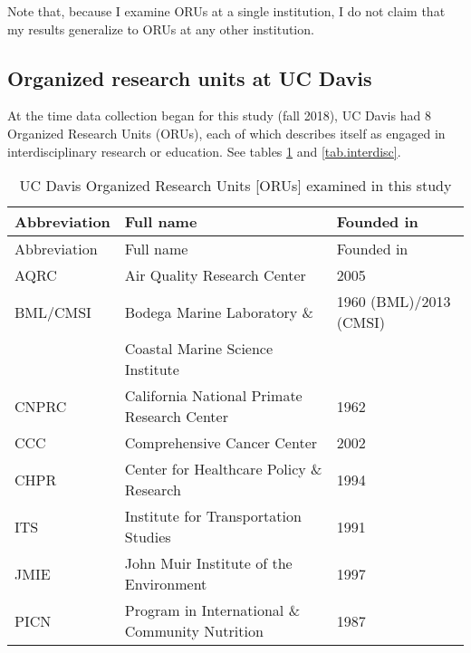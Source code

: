 \documentclass[
  11pt,
]{article}
\begin{document}
Note that, because I examine ORUs at a single institution, I do not claim that my results generalize to ORUs at any other institution.

\hypertarget{organized-research-units-at-uc-davis}{%
\subsection{Organized research units at UC Davis}\label{organized-research-units-at-uc-davis}}

At the time data collection began for this study (fall 2018), UC Davis had 8 Organized Research Units (ORUs), each of which describes itself as engaged in interdisciplinary research or education. See tables \ref{tab.orus} and \ref{tab.interdisc}.

\begin{longtable}[]{@{}lll@{}}
\caption{UC Davis Organized Research Units {[}ORUs{]} examined in this study \label{tab.orus}}\tabularnewline
\toprule
Abbreviation & Full name & Founded in \\
\midrule
\endfirsthead
\toprule
Abbreviation & Full name & Founded in \\
\midrule
\endhead
AQRC & Air Quality Research Center & 2005 \\
BML/CMSI & Bodega Marine Laboratory \& & 1960 (BML)/2013 (CMSI) \\
& Coastal Marine Science Institute & \\
CNPRC & California National Primate Research Center & 1962 \\
CCC & Comprehensive Cancer Center & 2002 \\
CHPR & Center for Healthcare Policy \& Research & 1994 \\
ITS & Institute for Transportation Studies & 1991 \\
JMIE & John Muir Institute of the Environment & 1997 \\
PICN & Program in International \& Community Nutrition & 1987 \\
\bottomrule
\end{longtable}
\end{document}
